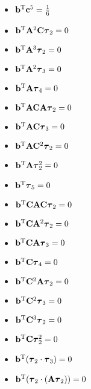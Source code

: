 \begin{itemize}
\begin{itemize}
      \item $\bb\transpose \bc^5 = \frac{1}{6}$
      \item $\bb\transpose \mA^2 \mC \ste_2 = 0$
      \item $\bb\transpose \mA^3 \ste_2 = 0$
      \item $\bb\transpose \mA^2 \ste_3 = 0$
      \item $\bb\transpose \mA \ste_4 = 0$
      \item $\bb\transpose \mA \mC \mA \ste_2 = 0$
      \item $\bb\transpose \mA \mC \ste_3 = 0$
      \item $\bb\transpose \mA \mC^2 \ste_2 = 0$
      \item $\bb\transpose \mA \ste_2^2 = 0$
      \item $\bb\transpose \ste_5 = 0$
      \item $\bb\transpose \mC \mA \mC \ste_2 = 0$
      \item $\bb\transpose \mC \mA^2 \ste_2 = 0$
      \item $\bb\transpose \mC \mA \ste_3 = 0$
      \item $\bb\transpose \mC \ste_4 = 0$
      \item $\bb\transpose \mC^2 \mA \ste_2 = 0$
      \item $\bb\transpose \mC^2 \ste_3 = 0$
      \item $\bb\transpose \mC^3 \ste_2 = 0$
      \item $\bb\transpose \mC \ste_2^2 = 0$
      \item $\bb\transpose (\ste_2\cdot\ste_3) = 0$
      \item $\bb\transpose (\ste_2 \cdot (\mA \ste_2)) = 0$
    \end{itemize}
\end{itemize}

